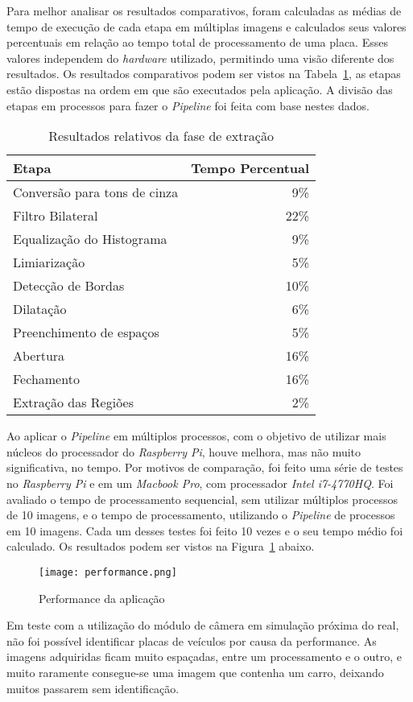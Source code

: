 Para melhor analisar os resultados comparativos, foram calculadas as médias de
tempo de execução de cada etapa em múltiplas imagens e calculados seus valores
percentuais em relação ao tempo total de processamento de uma placa. Esses
valores independem do \emph{hardware} utilizado, permitindo uma visão diferente
dos resultados.  Os resultados comparativos podem ser vistos na
Tabela~\ref{tab:resultados_relativos}, as etapas estão dispostas na ordem em que
são executados pela aplicação. A divisão das etapas em processos para fazer o
\emph{Pipeline} foi feita com base nestes dados.

\begin{table}[H]
\centering
\caption{Resultados relativos da fase de extração}
\label{tab:resultados_relativos}
\begin{tabular}{@{}lr@{}}
\toprule
Etapa                        & Tempo Percentual \\ \midrule
Conversão para tons de cinza & 9\%             \\
Filtro Bilateral             & 22\%             \\
Equalização do Histograma    & 9\%             \\
Limiarização                 & 5\%             \\
Detecção de Bordas           & 10\%             \\
Dilatação                    & 6\%             \\
Preenchimento de espaços     & 5\%             \\
Abertura                     & 16\%             \\
Fechamento                   & 16\%             \\
Extração das Regiões         & 2\%             \\ \bottomrule
\end{tabular}
\end{table}

Ao aplicar o \emph{Pipeline} em múltiplos processos, com o objetivo de
utilizar mais núcleos do processador do \emph{Raspberry Pi}, houve melhora, mas
não muito significativa, no tempo. Por motivos de comparação, foi feito
uma série de testes no \emph{Raspberry Pi} e em um
\emph{Macbook Pro}, com processador \emph{Intel i7-4770HQ}. Foi avaliado o tempo
de processamento sequencial, sem utilizar múltiplos processos de 10 imagens, e o
tempo de processamento, utilizando o \emph{Pipeline} de processos em 10 imagens.
Cada um desses testes foi feito 10 vezes e o seu tempo médio foi calculado.  Os
resultados podem ser vistos na Figura~\ref{fig:performance} abaixo.

\begin{figure}[H]
	\centering
	\texttt{[image: performance.png]}
	\caption{Performance da aplicação}
	\label{fig:performance}
\end{figure}


Em teste com a utilização do módulo de câmera em simulação próxima do real, não foi possível
identificar placas de veículos por causa da performance. As imagens adquiridas ficam muito espaçadas,
entre um processamento e o outro, e muito raramente consegue-se uma imagem que contenha um carro, deixando
muitos passarem sem identificação.

